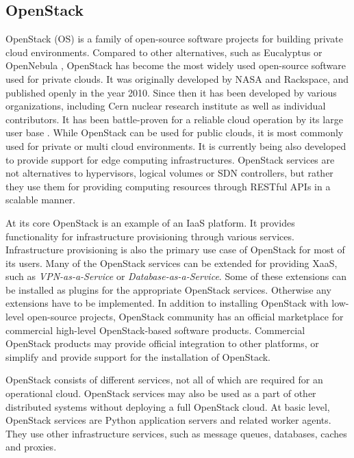 \subsection{OpenStack} \label{openstack}

OpenStack (OS) \cite{sefraoui2012openstack} is a family of open-source software
projects for building private cloud environments. Compared to other
alternatives, such as Eucalyptus \cite{eucalyptus} or OpenNebula
\cite{opennebula}, OpenStack has become the most widely used open-source
software used for private clouds. It was originally developed by NASA and
Rackspace, and published openly in the year 2010. Since then it has been
developed by various organizations, including Cern nuclear research institute
as well as individual contributors. It has been battle-proven for a reliable
cloud operation by its large user base \cite{miller2015brief}. While OpenStack
can be used for public clouds, it is most commonly used for private or multi
cloud environments. It is currently being also developed to provide support for
edge computing infrastructures. OpenStack services are not alternatives to
hypervisors, logical volumes or SDN controllers, but rather they use them for
providing computing resources through RESTful APIs in a scalable manner.

At its core OpenStack is an example of an IaaS platform. It provides
functionality for infrastructure provisioning through various services.
Infrastructure provisioning is also the primary use case of OpenStack for most
of its users. Many of the OpenStack services can be extended for providing
XaaS, such as \textit{VPN-as-a-Service} or \textit{Database-as-a-Service}. Some
of these extensions can be installed as plugins for the appropriate OpenStack
services. Otherwise any extensions have to be implemented. In addition to
installing OpenStack with low-level open-source projects, OpenStack community
has an official marketplace for commercial high-level OpenStack-based software
products. Commercial OpenStack products may provide official integration to
other platforms, or simplify and provide support for the installation of
OpenStack.

OpenStack consists of different services, not all of which are required for an
operational cloud. OpenStack services may also be used as a part of other
distributed systems without deploying a full OpenStack cloud. At basic level,
OpenStack services are Python application servers and related worker agents.
They use other infrastructure services, such as message queues, databases,
caches and proxies.

